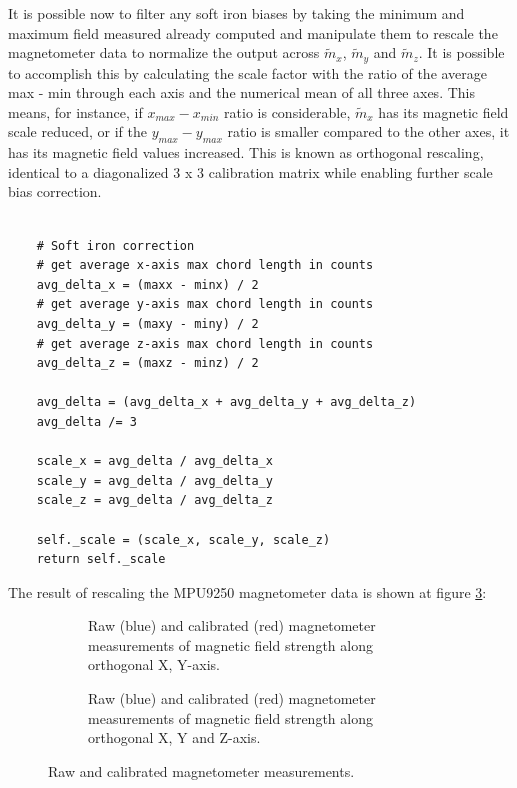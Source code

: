 It is possible now to filter any soft iron biases by taking the minimum and maximum field measured already computed and manipulate them to rescale the magnetometer data to normalize the output across $\widetilde{m}_x$, $\widetilde{m}_y$ and $\widetilde{m}_z$. It is possible to accomplish this by calculating the scale factor with the ratio of the average max - min through each axis and the numerical mean of all three axes. This means, for instance, if $x_{max} - x_{min}$ ratio is considerable, $\widetilde{m}_x$ has its magnetic field scale reduced, or if the $y_{max} - y_{max}$ ratio is smaller compared to the other axes, it has its magnetic field values increased. This is known as orthogonal rescaling, identical to a diagonalized 3 x 3 calibration matrix while enabling further scale bias correction.

\lstset{language=Python}
\begin{lstlisting}[frame=single]  % Start your code-block

    # Soft iron correction
    # get average x-axis max chord length in counts
    avg_delta_x = (maxx - minx) / 2
    # get average y-axis max chord length in counts
    avg_delta_y = (maxy - miny) / 2
    # get average z-axis max chord length in counts
    avg_delta_z = (maxz - minz) / 2

    avg_delta = (avg_delta_x + avg_delta_y + avg_delta_z)
    avg_delta /= 3

    scale_x = avg_delta / avg_delta_x
    scale_y = avg_delta / avg_delta_y
    scale_z = avg_delta / avg_delta_z

    self._scale = (scale_x, scale_y, scale_z)
    return self._scale

\end{lstlisting}

The result of rescaling the MPU9250 magnetometer data is shown at figure \ref{fig:mag_calibration_output}:

\begin{figure}[H]
    \centering
    \begin{subfigure}{0.7\textwidth}
        \centering
        \resizebox{1\linewidth}{!}{}
        \caption{Raw (blue) and calibrated (red) magnetometer measurements of magnetic field strength along orthogonal X, Y-axis.}
        \label{fig:magnetometer_calibrated2D}
    \end{subfigure}

    \begin{subfigure}{0.7\textwidth}
        \centering
        \resizebox{1\linewidth}{!}{}
        \caption{Raw (blue) and calibrated (red) magnetometer measurements of magnetic field strength along orthogonal X, Y and Z-axis.}
        \label{fig:magnetometer_calibrated3D}
    \end{subfigure}
    \caption{Raw and calibrated magnetometer measurements.}
    \label{fig:mag_calibration_output}
\end{figure}

